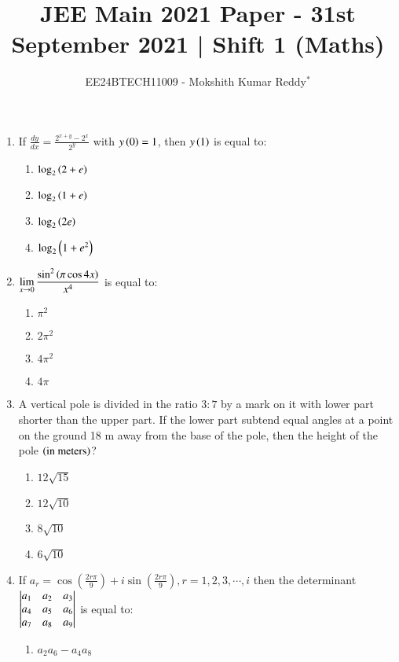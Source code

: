 \documentclass[journal,12pt,onecolumn]{IEEEtran}
\theoremstyle{remark}
\begin{document}

\vspace{3cm}

\title{JEE Main 2021 Paper - 31st September 2021 | Shift 1 (Maths)}
\author{EE24BTECH11009 - Mokshith Kumar Reddy$^{*}$%
}
\maketitle
\bigskip

\begin{enumerate}[start=16]
\item If $\frac{dy}{dx} = \frac{2^{x+y}-2^x}{2^y}$ with $y\left(0\right)=1$, then $y\left(1\right)$ is equal to:
\begin{enumerate}
\item $\log_2\left(2 + e\right)$
\item $\log_2\left(1 + e\right)$
\item $\log_2\left(2e\right)$
\item $\log_2\left(1 + e^2\right)$
\end{enumerate}
\item $\displaystyle \lim_{x \to 0} \frac{\sin^2\left(\pi\cos 4x\right)}{x^4}$
is equal to:
\begin{enumerate}
\item $\pi^2$  
\item $2\pi^2$
\item $4\pi^2$
\item $4\pi$
\end{enumerate}
\item A vertical pole is divided in the ratio $3:7$ by a mark on it with lower part shorter than the upper part. If the lower part subtend equal angles at a point on the ground 18 m away from the base of the pole, then the height of the pole $\left(\text{in meters}\right)$?
\begin{enumerate}
\item $12\sqrt{15}$
\item$12\sqrt{10}$
\item $8\sqrt{10}$
\item $6\sqrt{10}$
\end{enumerate}
\item If $a_r = \cos\left(\frac{2r\pi}{9}\right) + i\sin\left(\frac{2r\pi}{9}\right), r= 1,2,3,\cdots,i$ then the determinant 
$\begin{vmatrix}
a_1 & a_2 & a_3 \\
a_4 & a_5 & a_6 \\
a_7 & a_8 & a_9\end{vmatrix}
$
 is equal to:
\begin{enumerate}
\item $a_2a_6 - a_4a_8$

\end{enumerate}
\end{enumerate}
\end{document}

